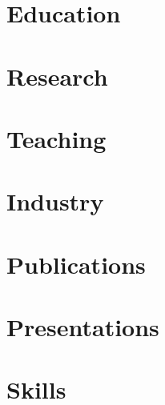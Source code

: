 \documentclass{klmr-cv}
\author{Konrad Rudolph}
\begin{document}
\maketitle

\section{Education}

\section{Research}

\section{Teaching}

\section{Industry}

\section{Publications}

\section{Presentations}

\section{Skills}
\end{document}
